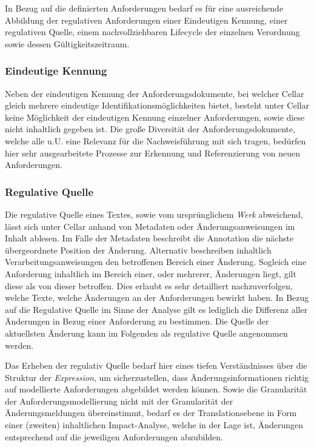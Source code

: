     In Bezug auf die definierten Anforderungen bedarf es für eine ausreichende Abbildung der regulativen Anforderungen einer Eindeutigen Kennung, einer regulativen Quelle, einem nachvollziehbaren Lifecycle der einzelnen Verordnung sowie dessen Gültigkeitszeitraum.
    
\subsubsection{Eindeutige Kennung}
    
    Neben der eindeutigen Kennung der Anforderungsdokumente, bei welcher Cellar gleich mehrere eindeutige Identifikationsmöglichkeiten bietet, besteht unter Cellar keine Möglichkeit der eindeutigen Kennung einzelner Anforderungen, sowie diese nicht inhaltlich gegeben ist. 
    Die große Diversität der Anforderungsdokumente, welche alle u.U. eine Relevanz für die Nachweisführung mit sich tragen, bedürfen hier sehr ausgearbeitete Prozesse zur Erkennung und Referenzierung von neuen Anforderungen.  

\subsubsection{Regulative Quelle}
    
    Die regulative Quelle eines Textes, sowie vom ursprünglichem \textit{Werk} abweichend, lässt sich unter Cellar anhand von Metadaten oder Änderungsanweisungen im Inhalt ablesen.
    Im Falle der Metadaten beschreibt die Annotation die nächste übergeordnete Position der Änderung.
    Alternativ beschreiben inhaltlich Verarbeitungsanweisungen den betroffenen Bereich einer Änderung. 
    Sogleich eine Anforderung inhaltlich im Bereich einer, oder mehrerer, Änderungen liegt, gilt diese als von dieser betroffen.
    Dies erlaubt es sehr detailliert nachzuverfolgen, welche Texte, welche Änderungen an der Anforderungen bewirkt haben.
    In Bezug auf die Regulative Quelle im Sinne der Analyse gilt es lediglich die Differenz aller Änderungen in Bezug einer Anforderung zu bestimmen.
    Die Quelle der aktuellsten Änderung kann im Folgenden als regulative Quelle angenommen werden.

    \medskip
    Das Erheben der regulativ Quelle bedarf hier eines tiefen Verständnisses über die Struktur der \textit{Expression}, um sicherzustellen, dass Änderungsinformationen richtig auf modellierte Anforderungen abgebildet werden können.
    Sowie die Granularität der Anforderungsmodellierung nicht mit der Granularität der Änderungsmeldungen übereinstimmt, bedarf es der Translationsebene in Form einer (zweiten) inhaltlichen Impact-Analyse, welche in der Lage ist, Änderungen entsprechend auf die jeweiligen Anforderungen abzubilden.
    


